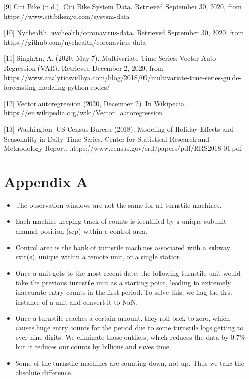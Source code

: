 \documentclass{article}
\begin{document}
[9] Citi Bike (n.d.). Citi Bike System Data. Retrieved September 30, 2020, from https://www.citibikenyc.com/system-data

[10] Nychealth. nychealth/coronavirus-data. Retrieved September 30, 2020, from https://github.com/nychealth/coronavirus-data

[11] SinghAn, A. (2020, May 7). Multivariate Time Series: Vector Auto Regression (VAR). Retrieved December 2, 2020, from https://www.analyticsvidhya.com/blog/2018/09/multivariate-time-series-guide-forecasting-modeling-python-codes/

[12] Vector autoregression (2020, December 2). In Wikipedia. https://en.wikipedia.org/wiki/Vector\_autoregression

[13] Washington: US Census Bureau (2018). Modeling of Holiday Effects and Seasonality in Daily Time Series. Center for Statistical Research and Methodology Report. https://www.census.gov/srd/papers/pdf/RRS2018-01.pdf

\newpage
\section*{Appendix A}
\begin{itemize}
    \item The observation windows are not the same for all turnstile machines.
    \item Each machine keeping track of counts is identified by a unique subunit channel position (scp) within a control area.
    \item Control area is the bank of turnstile machines associated with a subway exit(s), unique within a remote unit, or a single station.
    \item Once a unit gets to the most recent date, the following turnstile unit would take the previous turnstile unit as a starting point, leading to extremely inaccurate entry counts in the first period. To solve this, we flag the first instance of a unit and convert it to NaN.
    \item Once a turnstile reaches a certain amount, they roll back to zero, which causes huge entry counts for the period due to some turnstile logs getting to over nine digits. We eliminate those outliers, which reduces the data by 0.7\% but it reduces our counts by billions and saves time. 
    \item Some of the turnstile machines are counting down, not up. Thus we take the absolute difference. 
\end{itemize}
\end{document}
